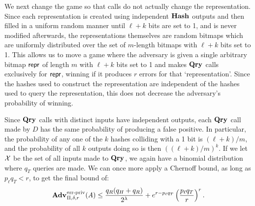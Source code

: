 We next change the game so that calls do not actually change the representation.
Since each
representation is created using independent $\textup{\textbf{Hash}}\hspace{0.5pt}$ outputs and then filled
in a uniform random manner until $\ell+k$ bits are set to 1, and is never
modified afterwards, the representations
themselves are random bitmaps which are uniformly distributed over the set of
$m$-length bitmaps with $\ell+k$ bits set to 1. This allows us to move
a game where the adversary is given a single arbitrary bitmap $\mathsf{repr}$
of length $m$ with $\ell+k$ bits set to 1 and makes $\textup{\textbf{Qry}}\hspace{0.5pt}$ calls exclusively
for $\mathsf{repr}$, winning if it produces $r$ errors for that `representation'. Since
the hashes used to construct the representation are independent of the hashes
used to query the representation, this does not decrease the adversary's
probability of winning.

Since $\textup{\textbf{Qry}}\hspace{0.5pt}$ calls with distinct inputs have independent outputs, each $\textup{\textbf{Qry}}\hspace{0.5pt}$ call made by $D$ has the same probability of producing a false positive. In particular, the probability of any one of the $k$ hashes colliding with a 1 bit is $(\ell+k)/m$, and the probability of all $k$ outputs doing so is then $((\ell+k)/m)^k$. If we let $\mathcal{X}$ be the set of all inputs made to $\textup{\textbf{Qry}}\hspace{0.5pt}$, we again have a binomial distribution where $q_T$ queries are made. We can once more apply a Chernoff bound, as long as $p_\ell q_T < r$, to get the final bound of:
\begin{equation}
   \Adv{\erreps}_{\Pi,\delta,r}(\advA) \leq
     \frac{q_R(q_H+q_R)}{2^\lambda} + e^{r-p_\ell q_T}\left(\frac{p_\ell q_T}{r}\right)^r.
\end{equation}
